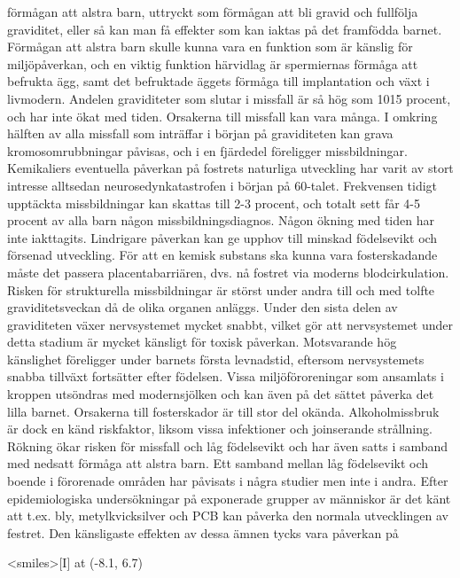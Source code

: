 förmågan att alstra barn, uttryckt som förmågan att bli gravid och fullfölja graviditet, eller så kan man få effekter som kan iaktas på det framfödda barnet. Förmågan att alstra barn skulle kunna vara en funktion som är känslig för miljöpåverkan, och en viktig funktion härvidlag är spermiernas förmåga att befrukta ägg, samt det befruktade äggets förmåga till implantation och växt i livmodern.
Andelen graviditeter som slutar i missfall är så hög som 1015 procent, och har inte ökat med tiden. Orsakerna till missfall kan vara många. I omkring hälften av alla missfall som inträffar i början på graviditeten kan grava kromosomrubbningar påvisas, och i en fjärdedel föreligger missbildningar.
Kemikaliers eventuella påverkan på fostrets naturliga utveckling har varit av stort intresse alltsedan neurosedynkatastrofen i början på 60-talet. Frekvensen tidigt upptäckta missbildningar kan skattas till 2-3 procent, och totalt sett får 4-5 procent av alla barn någon missbildningsdiagnos. Någon ökning med tiden har inte iakttagits. Lindrigare påverkan kan ge upphov till minskad födelsevikt och försenad utveckling.
För att en kemisk substans ska kunna vara fosterskadande måste det passera placentabarriären, dvs. nå fostret via moderns blodcirkulation. Risken för strukturella missbildningar är störst under andra till och med tolfte graviditetsveckan då de olika organen anläggs. Under den sista delen av graviditeten växer nervsystemet mycket snabbt, vilket gör att nervsystemet under detta stadium är mycket känsligt för toxisk påverkan. Motsvarande hög känslighet föreligger under barnets första levnadstid, eftersom nervsystemets snabba tillväxt fortsätter efter födelsen. Vissa miljöföroreningar som ansamlats i kroppen utsöndras med modernsjölken och kan även på det sättet påverka det lilla barnet.
Orsakerna till fosterskador är till stor del okända. Alkoholmissbruk är dock en känd riskfaktor, liksom vissa infektioner och joinserande strållning. Rökning ökar risken för missfall och låg födelsevikt och har även satts i samband med nedsatt förmåga att alstra barn. Ett samband mellan låg födelsevikt och boende i förorenade områden har påvisats i några studier men inte i andra.
Efter epidemiologiska undersökningar på exponerade grupper av människor är det känt att t.ex. bly, metylkvicksilver och PCB kan påverka den normala utvecklingen av festret. Den känsligaste effekten av dessa ämnen tycks vara påverkan på

<smiles>[I] at (-8.1, 6.7)


